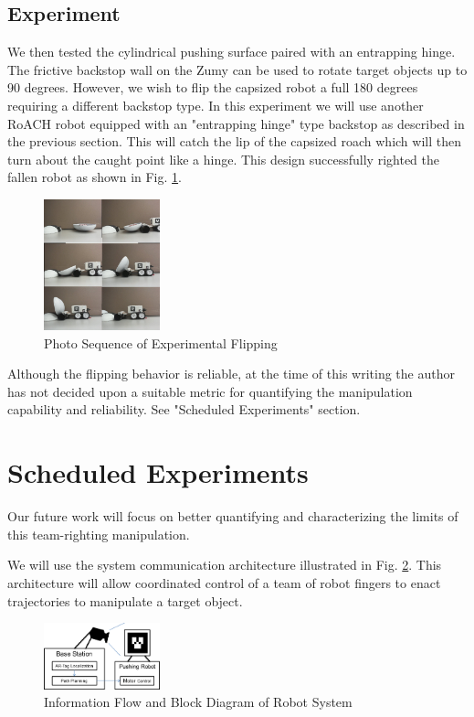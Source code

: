 \documentclass[a4paper]{article}
\begin{document}
\subsection{Experiment}
We then tested the cylindrical pushing surface paired with an entrapping hinge.
The frictive backstop wall on the Zumy can be used to rotate target objects up to 90 degrees.
However, we wish to flip the capsized robot a full 180 degrees requiring a different backstop type.
In this experiment we will use another RoACH robot equipped with an "entrapping hinge" type backstop as described in the previous section.
This will catch the lip of the capsized roach which will then turn about the caught point like a hinge.
This design successfully righted the fallen robot as shown in Fig. \ref{fig:photos}.

\begin{figure}[h!]
\centering
\includegraphics[width=0.3\textwidth]{Photo_Sequence.jpg}
\caption{\label{fig:photos}Photo Sequence of Experimental Flipping}
\end{figure}

Although the flipping behavior is reliable, at the time of this writing the author has not decided upon a suitable metric for quantifying the manipulation capability and reliability. See "Scheduled Experiments" section.

\clearpage
\section{Scheduled Experiments}
Our future work will focus on better quantifying and characterizing the limits of this team-righting manipulation.

We will use the system communication architecture illustrated in Fig. \ref{fig:system}.
This architecture will allow coordinated control of a team of robot fingers to enact trajectories to manipulate a target object.

\begin{figure}[h!]
\centering
\includegraphics[width=0.3\textwidth]{System_Block_Diagram.png}
\caption{\label{fig:system}Information Flow and Block Diagram of Robot System}
\end{figure}
\end{document}
